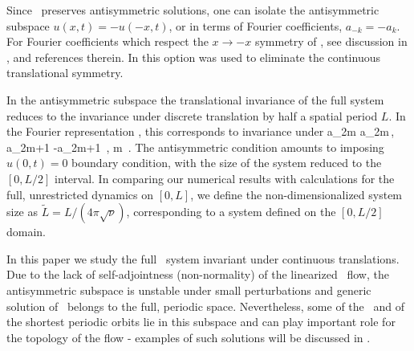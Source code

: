 Since \KSe\ preserves
antisymmetric solutions, one can isolate the antisymmetric
subspace 
$u(x,t)=-u(-x,t)$, or in terms of Fourier coefficients,
$a_{-k}= - a_k$. 
For Fourier coefficients which respect the $x \to -x$ symmetry of
\KSe, see discussion in ,
and references therein.
In  
this option was used to eliminate
the continuous translational symmetry.

In the antisymmetric subspace the translational 
invariance of the full system reduces
to the invariance under discrete
translation by half a spatial period $L$.
In the Fourier representation , 
this corresponds to invariance under 
\beq
a_{2m} \to a_{2m}\,, a_{2m+1} \to -a_{2m+1}
\,, m \in {}
\,.
The antisymmetric condition amounts to imposing
$u(0,t)=0$ boundary condition, with
the size of the system reduced to
the $[0,L/2]$ interval. In
comparing our numerical results with %
calculations for
the full, unrestricted dynamics on $[0,L]$, we define
the non-dimensionalized system size as
$\tilde{L} = {L}/{(4 \pi \sqrt{\nu})}$,
corresponding to a system defined on the
$[0,L/2]$ domain. 

In this paper we study the full \KS\ system invariant
under continuous translations. Due to the lack of self-adjointness
(non-normality) of the linearized \KS\ flow, 
the antisymmetric subspace
is unstable under small perturbations and generic solution of 
\KSe\ belongs to the full, periodic space. Nevertheless, some of
the \eqva\ and of the shortest periodic orbits lie in this subspace
and can play important role for the topology of the flow - examples
of such solutions will be discussed in .
